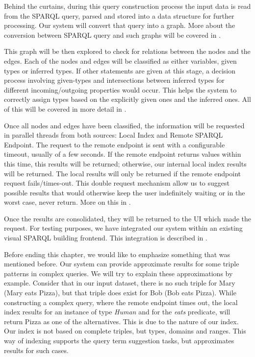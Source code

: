 Behind the curtains, during this query construction process the input data is read from the SPARQL query, parsed and stored into a data structure for further processing. 
Our system will convert that query into a graph. 
More about the conversion between SPARQL query and such graphs will be covered in .

This graph will be then explored to check for relations between the nodes and the edges. 
Each of the nodes and edges will be classified as either variables, given types or inferred types. 
If other statements are given at this stage, a decision process involving given-types and intersections between inferred types for different incoming/outgoing properties would occur. 
This helps the system to correctly assign types based on the explicitly given ones and the inferred ones. 
All of this will be covered in more detail in .

Once all nodes and edges have been classified, the information will be requested in parallel threads from both sources: 
Local Index and Remote SPARQL Endpoint. 
The request to the remote endpoint is sent with a configurable timeout, usually of a few seconds. 
If the remote endpoint returns values within this time, this results will be returned; otherwise, our internal local index results will be returned. The local results will only be returned if the remote endpoint request fails/times-out. 
This double request mechanism allow us to suggest possible results that would otherwise keep the user indefinitely waiting or in the worst case, never return. 
More on this in .

Once the results are consolidated, they will be returned to the UI which made the request. 
For testing purposes, we have integrated our system within an existing visual SPARQL building frontend. 
This integration is described in .

Before ending this chapter, we would like to emphasize something that was mentioned before. 
Our system can provide approximate results for some triple patterns in complex queries. 
We will try to explain these approximations by example. 
Consider that in our input dataset, there is no such triple for Mary (Mary eats Pizza), but that triple does exist for Bob (Bob eats Pizza). 
While constructing a complex query, where the remote endpoint times out, the local index results for an instance of type \textit{Human} and for the \textit{eats} predicate, will return Pizza as one of the alternatives.
This is due to the nature of our index.
Our index is not based on complete triples, but types, domains and ranges.
This way of indexing supports the query term suggestion tasks, but approximates results for such cases.